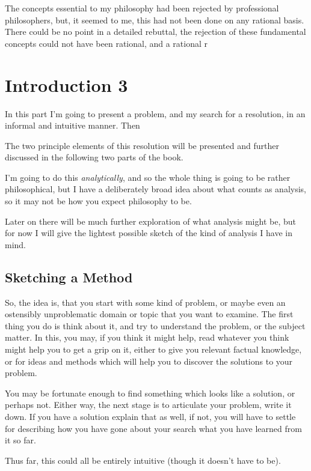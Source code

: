 The concepts essential to my philosophy had been rejected by professional philosophers, but, it seemed to me, this had not been done on any rational basis.
There could be no point in a detailed rebuttal, the rejection of these fundamental concepts could not have been rational, and a rational r

\chapter{Introduction 3}\label{Introduction}

In this part I'm going to present a problem, and my search for a resolution, in an informal and intuitive manner.
Then


The two principle elements of this resolution will be presented and further discussed in the following two parts of the book.

I'm going to do this {\it analytically}, and so the whole thing is going to be rather philosophical, but I have a deliberately broad idea about what counts as analysis, so it may not be how you expect philosophy to be.

Later on there will be much further exploration of what analysis might be, but for now I will give the lightest possible sketch of the kind of analysis I have in mind.

\section{Sketching a Method}

So, the idea is, that you start with some kind of problem, or maybe even an ostensibly unproblematic domain or topic that you want to examine.
The first thing you do is think about it, and try to understand the problem, or the subject matter.
In this, you may, if you think it might help, read whatever you think might help you to get a grip on it, either to give you relevant factual knowledge, or for ideas and methods which will help you to discover the solutions to your problem.

You may be fortunate enough to find something which looks like a solution, or perhaps not.
Either way, the next stage is to articulate your problem, write it down.
If you have a solution explain that as well, if not, you will have to settle for describing how you have gone about your search what you have learned from it so far.

Thus far, this could all be entirely intuitive (though it doesn't have to be).

